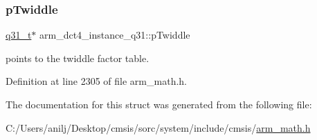 \subsubsection{\texorpdfstring{p\+Twiddle}{pTwiddle}}
{\footnotesize\ttfamily \hyperlink{arm__math_8h_adc89a3547f5324b7b3b95adec3806bc0}{q31\+\_\+t}$\ast$ arm\+\_\+dct4\+\_\+instance\+\_\+q31\+::p\+Twiddle}

points to the twiddle factor table. 

Definition at line 2305 of file arm\+\_\+math.\+h.



The documentation for this struct was generated from the following file\+:\begin{DoxyCompactItemize}
\item 
C\+:/\+Users/anilj/\+Desktop/cmsis/sorc/system/include/cmsis/\hyperlink{arm__math_8h}{arm\+\_\+math.\+h}\end{DoxyCompactItemize}
